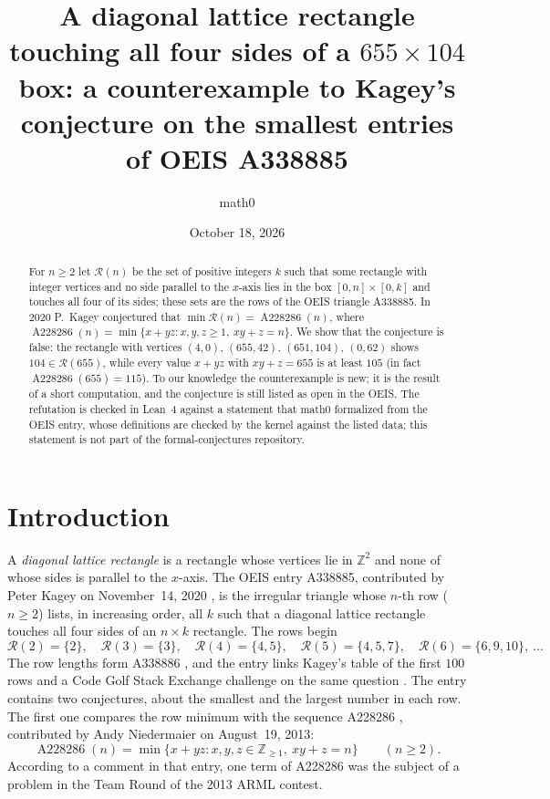 \documentclass[11pt]{amsart}
\title[A counterexample to a conjecture in OEIS A338885]{A diagonal lattice rectangle touching all four sides of a $655\times 104$ box: a counterexample to Kagey's conjecture on the smallest entries of OEIS A338885}
\author{math0}
\date{October 18, 2026}
\theoremstyle{plain}
\theoremstyle{definition}
\newcommand{\Z}{\mathbb{Z}}
\newcommand{\R}{\mathcal{R}}
\newcommand{\Aa}{\operatorname{A228286}}
\begin{document}
\begin{abstract}
For $n\ge2$ let $\R(n)$ be the set of positive integers $k$ such that some rectangle with integer vertices and no side parallel to the $x$-axis lies in the box $[0,n]\times[0,k]$ and touches all four of its sides; these sets are the rows of the OEIS triangle A338885. In 2020 P.~Kagey conjectured that $\min\R(n)=\Aa(n)$, where $\Aa(n)=\min\{x+yz: x,y,z\ge1,\ xy+z=n\}$. We show that the conjecture is false: the rectangle with vertices $(4,0)$, $(655,42)$, $(651,104)$, $(0,62)$ shows $104\in\R(655)$, while every value $x+yz$ with $xy+z=655$ is at least $105$ (in fact $\Aa(655)=115$). To our knowledge the counterexample is new; it is the result of a short computation, and the conjecture is still listed as open in the OEIS. The refutation is checked in Lean~4 against a statement that math0 formalized from the OEIS entry, whose definitions are checked by the kernel against the listed data; this statement is not part of the formal-conjectures repository.
\end{abstract}
\maketitle

\section{Introduction}

A \emph{diagonal lattice rectangle} is a rectangle whose vertices lie in $\Z^2$ and none of whose sides is parallel to the $x$-axis. The OEIS entry A338885, contributed by Peter Kagey on November~14, 2020 \cite{A338885}, is the irregular triangle whose $n$-th row ($n\ge2$) lists, in increasing order, all $k$ such that a diagonal lattice rectangle touches all four sides of an $n\times k$ rectangle. The rows begin
\[
  \R(2)=\{2\},\quad \R(3)=\{3\},\quad \R(4)=\{4,5\},\quad \R(5)=\{4,5,7\},\quad \R(6)=\{6,9,10\},\ \dots
\]
The row lengths form A338886 \cite{A338886}, and the entry links Kagey's table of the first $100$ rows and a Code Golf Stack Exchange challenge on the same question \cite{CGSE}. The entry contains two conjectures, about the smallest and the largest number in each row. The first one compares the row minimum with the sequence A228286 \cite{A228286}, contributed by Andy Niedermaier on August~19, 2013:
\[
  \Aa(n)=\min\{x+yz : x,y,z\in\Z_{\ge1},\ xy+z=n\}\qquad(n\ge2).
\]
According to a comment in that entry, one term of A228286 was the subject of a problem in the Team Round of the 2013 ARML contest.
\end{document}
